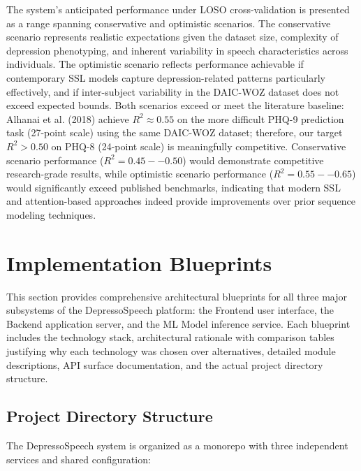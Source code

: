 \documentclass[12pt]{article}
\begin{document}
	The system's anticipated performance under LOSO cross-validation is presented as a range spanning conservative and optimistic scenarios. The conservative scenario represents realistic expectations given the dataset size, complexity of depression phenotyping, and inherent variability in speech characteristics across individuals. The optimistic scenario reflects performance achievable if contemporary SSL models capture depression-related patterns particularly effectively, and if inter-subject variability in the DAIC-WOZ dataset does not exceed expected bounds. Both scenarios exceed or meet the literature baseline: Alhanai et al. (2018) achieve $R^2 \approx 0.55$ on the more difficult PHQ-9 prediction task (27-point scale) using the same DAIC-WOZ dataset; therefore, our target $R^2 > 0.50$ on PHQ-8 (24-point scale) is meaningfully competitive. Conservative scenario performance ($R^2 = 0.45--0.50$) would demonstrate competitive research-grade results, while optimistic scenario performance ($R^2 = 0.55--0.65$) would significantly exceed published benchmarks, indicating that modern SSL and attention-based approaches indeed provide improvements over prior sequence modeling techniques.


	\section{Implementation Blueprints}

	This section provides comprehensive architectural blueprints for all three major subsystems of the DepressoSpeech platform: the Frontend user interface, the Backend application server, and the ML Model inference service. Each blueprint includes the technology stack, architectural rationale with comparison tables justifying why each technology was chosen over alternatives, detailed module descriptions, API surface documentation, and the actual project directory structure.


	\subsection{Project Directory Structure}

	The DepressoSpeech system is organized as a monorepo with three independent services and shared configuration:
\end{document}
